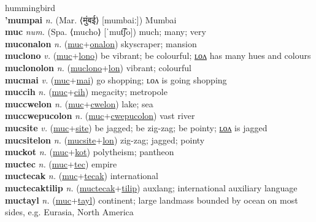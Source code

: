 hummingbird \label{mumucipcip} \\
\textbf{'mumpai} \textit{n.} (Mar. ⟨मुंबई⟩ [mumbaiː])
Mumbai \label{'mumpai} \\
\textbf{muc} \textit{num.} (Spa. ⟨mucho⟩ [ˈmut͡ʃo])
much; many; very \label{muc} \\
\textbf{muconalon} \textit{n.} (\hyperref[muc]{muc}+\hyperref[onalon]{onalon})
skyscraper; mansion \label{muconalon} \\
\textbf{muclono} \textit{v.} (\hyperref[muc]{muc}+\hyperref[lono]{lono})
be vibrant; be colourful; \hyperref[muclonolon]{ʟᴏᴧ} has many hues and colours \label{muclono} \\
\textbf{muclonolon} \textit{n.} (\hyperref[muclono]{muclono}+\hyperref[lon]{lon})
vibrant; colourful \label{muclonolon} \\
\textbf{mucmai} \textit{v.} (\hyperref[muc]{muc}+\hyperref[mai]{mai})
go shopping; ʟᴏᴧ is going shopping \label{mucmai} \\
\textbf{muccih} \textit{n.} (\hyperref[muc]{muc}+\hyperref[cih]{cih})
megacity; metropole \label{muccih} \\
\textbf{muccwelon} \textit{n.} (\hyperref[muc]{muc}+\hyperref[cwelon]{cwelon})
lake; sea \label{muccwelon} \\
\textbf{muccwepucolon} \textit{n.} (\hyperref[muc]{muc}+\hyperref[cwepucolon]{cwepucolon})
vast river \label{muccwepucolon} \\
\textbf{mucsite} \textit{v.} (\hyperref[muc]{muc}+\hyperref[site]{site})
be jagged; be zig-zag; be pointy; \hyperref[mucsitelon]{ʟᴏᴧ} is jagged \label{mucsite} \\
\textbf{mucsitelon} \textit{n.} (\hyperref[mucsite]{mucsite}+\hyperref[lon]{lon})
zig-zag; jagged; pointy \label{mucsitelon} \\
\textbf{muckot} \textit{n.} (\hyperref[muc]{muc}+\hyperref[kot]{kot})
polytheism; pantheon \label{muckot} \\
\textbf{muctec} \textit{n.} (\hyperref[muc]{muc}+\hyperref[tec]{tec})
empire \label{muctec} \\
\textbf{muctecak} \textit{n.} (\hyperref[muc]{muc}+\hyperref[tecak]{tecak})
international \label{muctecak} \\
\textbf{muctecaktilip} \textit{n.} (\hyperref[muctecak]{muctecak}+\hyperref[tilip]{tilip})
auxlang; international auxiliary language \label{muctecaktilip} \\
\textbf{muctayl} \textit{n.} (\hyperref[muc]{muc}+\hyperref[tayl]{tayl})
continent; large landmass bounded by ocean on most sides, e.g. Eurasia, North America \label{muctayl} \\
